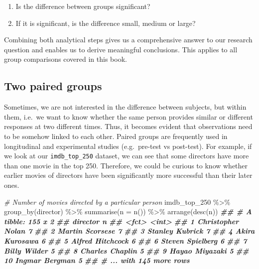 \documentclass[
]{book}
\newenvironment{Shaded}{\begin{snugshade}}{\end{snugshade}}
\newcommand{\AttributeTok}[1]{\textcolor[rgb]{0.77,0.63,0.00}{#1}}
\newcommand{\CommentTok}[1]{\textcolor[rgb]{0.56,0.35,0.01}{\textit{#1}}}
\newcommand{\DocumentationTok}[1]{\textcolor[rgb]{0.56,0.35,0.01}{\textbf{\textit{#1}}}}
\newcommand{\FunctionTok}[1]{\textcolor[rgb]{0.00,0.00,0.00}{#1}}
\newcommand{\NormalTok}[1]{#1}
\newcommand{\SpecialCharTok}[1]{\textcolor[rgb]{0.00,0.00,0.00}{#1}}
\begin{document}
\begin{enumerate}
\def\labelenumi{\arabic{enumi}.}
\item
  Is the difference between groups significant?
\item
  If it is significant, is the difference small, medium or large?
\end{enumerate}

Combining both analytical steps gives us a comprehensive answer to our research question and enables us to derive meaningful conclusions. This applies to all group comparisons covered in this book.

\hypertarget{two-paired-groups}{%
\subsection{Two paired groups}\label{two-paired-groups}}

Sometimes, we are not interested in the difference between subjects, but within them, i.e.~we want to know whether the same person provides similar or different responses at two different times. Thus, it becomes evident that observations need to be somehow linked to each other. Paired groups are frequently used in longitudinal and experimental studies (e.g.~pre-test vs post-test). For example, if we look at our \texttt{imdb\_top\_250} dataset, we can see that some directors have more than one movie in the top 250. Therefore, we could be curious to know whether earlier movies of directors have been significantly more successful than their later ones.

\begin{Shaded}
\begin{Highlighting}[]
\CommentTok{\# Number of movies directed by a particular person}
\NormalTok{imdb\_top\_250 }\SpecialCharTok{\%\textgreater{}\%}
  \FunctionTok{group\_by}\NormalTok{(director) }\SpecialCharTok{\%\textgreater{}\%}
  \FunctionTok{summarise}\NormalTok{(}\AttributeTok{n =} \FunctionTok{n}\NormalTok{()) }\SpecialCharTok{\%\textgreater{}\%}
  \FunctionTok{arrange}\NormalTok{(}\FunctionTok{desc}\NormalTok{(n))}
\DocumentationTok{\#\# \# A tibble: 155 x 2}
\DocumentationTok{\#\#    director              n}
\DocumentationTok{\#\#    \textless{}fct\textgreater{}             \textless{}int\textgreater{}}
\DocumentationTok{\#\#  1 Christopher Nolan     7}
\DocumentationTok{\#\#  2 Martin Scorsese       7}
\DocumentationTok{\#\#  3 Stanley Kubrick       7}
\DocumentationTok{\#\#  4 Akira Kurosawa        6}
\DocumentationTok{\#\#  5 Alfred Hitchcock      6}
\DocumentationTok{\#\#  6 Steven Spielberg      6}
\DocumentationTok{\#\#  7 Billy Wilder          5}
\DocumentationTok{\#\#  8 Charles Chaplin       5}
\DocumentationTok{\#\#  9 Hayao Miyazaki        5}
\DocumentationTok{\#\# 10 Ingmar Bergman        5}
\DocumentationTok{\#\# \# ... with 145 more rows}
\end{Highlighting}
\end{Shaded}
\end{document}
